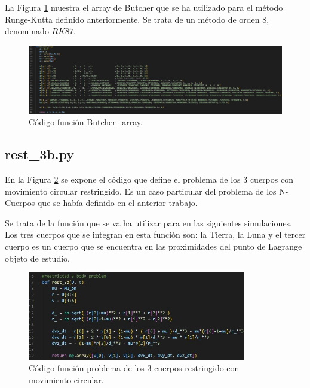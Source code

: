 \documentclass[12pt,a4paper]{article}
\begin{document}
La Figura \ref{erk3} muestra el array de Butcher que se ha utilizado para el método Runge-Kutta definido anteriormente. Se trata de un método de orden 8, denominado $RK87$.
\begin{figure}[H]
	\centering
	\includegraphics[width=1\textwidth]{FIGURES/mil6/codigo/erk3.JPG}
	\caption{Código función Butcher\_array.}
	\label{erk3}
\end{figure}

\subsection{rest\_3b.py}
En la Figura \ref{r3bp1} se expone el código que define el problema de los 3 cuerpos con movimiento circular restringido. Es un caso particular del problema de los N-Cuerpos que se había definido en el anterior trabajo.

Se trata de la función que se va ha utilizar para en las siguientes simulaciones. Los tres cuerpos que se integran en esta función son: la Tierra, la Luna y el tercer cuerpo es un cuerpo que se encuentra en las proximidades del punto de Lagrange objeto de estudio.

\begin{figure}[H]
	\centering
	\includegraphics[width=0.85\textwidth]{FIGURES/mil6/codigo/r3bp1.JPG}
	\caption{Código función problema de los 3 cuerpos restringido con movimiento circular.}
	\label{r3bp1}
\end{figure}
\end{document}
